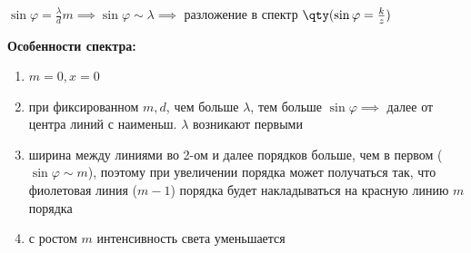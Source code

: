 $\sin\varphi = \frac{\lambda}{d} m \implies \sin\varphi \sim \lambda \implies$ разложение в спектр $\qty(\sin\varphi = \frac{k}{z})$

\textbf{Особенности спектра:}
\begin{enumerate}
	\item $m=0, x=0$
	\item при фиксированном $m, d$, чем больше $\lambda$, тем больше $\sin\varphi \implies$ далее от центра линий с наименьш. $\lambda$ возникают первыми
	\item ширина между линиями во 2-ом и далее порядков больше, чем в первом ($\sin\varphi \sim m$), поэтому при увеличении порядка может получаться так, что фиолетовая линия ($m-1$) порядка будет накладываться на красную линию $m$ порядка
	\item с ростом $m$ интенсивность света уменьшается
\end{enumerate}

